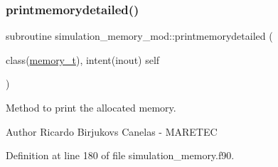 \subsubsection{\texorpdfstring{printmemorydetailed()}{printmemorydetailed()}}
{\footnotesize\ttfamily subroutine simulation\+\_\+memory\+\_\+mod\+::printmemorydetailed (\begin{DoxyParamCaption}\item[{class(\mbox{\hyperlink{structsimulation__memory__mod_1_1memory__t}{memory\+\_\+t}}), intent(inout)}]{self }\end{DoxyParamCaption})\hspace{0.3cm}{\ttfamily [private]}}



Method to print the allocated memory. 

\begin{DoxyAuthor}{Author}
Ricardo Birjukovs Canelas -\/ M\+A\+R\+E\+T\+EC 
\end{DoxyAuthor}


Definition at line 180 of file simulation\+\_\+memory.\+f90.


